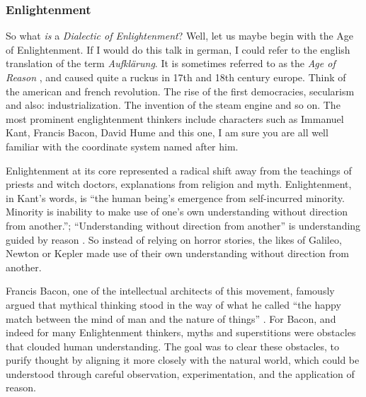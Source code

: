 \subsubsection*{Enlightenment}
So what \emph{is} a \emph{Dialectic of Enlightenment}? Well, let us maybe begin
with the Age of Enlightenment. If I would do this talk in german, I could refer
to the english translation of the term \emph{Aufklärung}. It is sometimes
referred to as the \emph{Age of Reason} \cite{bristowEnlightenment2023}, and caused
quite a ruckus in 17th and 18th century europe. Think of the american and
french revolution. The rise of the first democracies, secularism and also:
industrialization. The invention of the steam engine and so on.
The most prominent
englightenment thinkers include characters such as Immanuel Kant, Francis
Bacon, David Hume and this one, I am sure you are all well familiar with the
coordinate system named after him.

Enlightenment at its core represented a radical shift away from the teachings
of priests and witch doctors, explanations from religion and myth.
Enlightenment, in Kant's words, is \enquote{the human being's emergence from
self-incurred minority. Minority is inability to make use of one's own
understanding without direction from another.}; \enquote{Understanding without
direction from another} is understanding guided by reason
\cite{kantBeantwortungFrageWas1784,kantKritikReinenVernunft1781}. So instead of
relying on horror stories, the likes of Galileo, Newton or Kepler made use of
their own understanding without direction from another.

Francis Bacon, one of the intellectual architects of this movement, famously
argued that mythical thinking stood in the way of what he called \enquote{the happy
match between the mind of man and the nature of things}
\cite{baconWorksFrancisBacon2011}. For Bacon, and indeed
for many Enlightenment thinkers, myths and superstitions were obstacles that
clouded human understanding. The goal was to clear these obstacles, to purify
thought by aligning it more closely with the natural world, which could be
understood through careful observation, experimentation, and the application of
reason.


